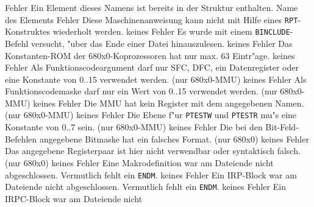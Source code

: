 \documentclass[12pt,a4paper,twoside]{report}
\newcommand{\tty}[1]{{\tt #1}}
\begin{document}
\begin{description}
               {Fehler}
               {Ein Element dieses Namens ist bereits in der Struktur
                enthalten.}
               {Name des Elements}
               {Fehler}
               {Diese Maschinenanweisung kann nicht mit Hilfe eines
                {\tt RPT}-Konstruktes wiederholt werden.}
               {keines}
               {Fehler}
               {Es wurde mit einem \tty{BINCLUDE}-Befehl versucht,
                "uber das Ende einer Datei hinauszulesen.}
               {keines}
               {Fehler}
               {Das Konstanten-ROM der 680x0-Koprozessoren hat
                nur max. 63 Eintr"age.}
               {keines}
               {Fehler}
               {Als Funktionscodeargument darf nur SFC, DFC, ein
                Datenregister oder eine Konstante von 0..15 verwendet
                werden. (nur 680x0-MMU)}
               {keines}
               {Fehler}
               {Als Funktionscodemaske darf nur ein Wert von
                0..15 verwendet werden. (nur 680x0-MMU)}
               {keines}
               {Fehler}
               {Die MMU hat kein Register mit dem angegebenen
                Namen. (nur 680x0-MMU)}
               {keines}
               {Fehler}
               {Die Ebene f"ur \tty{PTESTW} und \tty{PTESTR} mu"s eine
                Konstante von 0..7 sein. (nur 680x0-MMU)}
               {keines}
               {Fehler}
               {Die bei den Bit-Feld-Befehlen angegebene
                Bitmaske hat ein falsches Format. (nur 680x0)}
               {keines}
               {Fehler}
               {Das angegebene Registerpaar ist hier nicht
                verwendbar oder syntaktisch falsch. (nur 680x0)}
               {keines}
               {Fehler}
               {Eine Makrodefinition war am Dateiende nicht
                abgeschlossen.  Vermutlich fehlt ein \tty{ENDM}.}
               {keines}
               {Fehler}
               {Ein IRP-Block war am Dateiende nicht
                abgeschlossen.  Vermutlich fehlt ein \tty{ENDM}.}
               {keines}
               {Fehler}
               {Ein IRPC-Block war am Dateiende nicht
}
\end{description}
\end{document}
